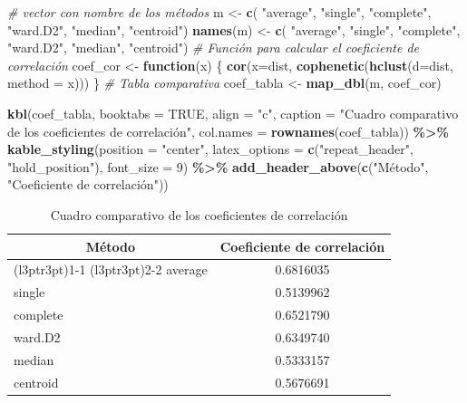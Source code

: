 \documentclass[
]{book}
\newenvironment{Shaded}{\begin{snugshade}}{\end{snugshade}}
\newcommand{\AttributeTok}[1]{\textcolor[rgb]{0.13,0.29,0.53}{#1}}
\newcommand{\CommentTok}[1]{\textcolor[rgb]{0.56,0.35,0.01}{\textit{#1}}}
\newcommand{\ConstantTok}[1]{\textcolor[rgb]{0.56,0.35,0.01}{#1}}
\newcommand{\ControlFlowTok}[1]{\textcolor[rgb]{0.13,0.29,0.53}{\textbf{#1}}}
\newcommand{\DecValTok}[1]{\textcolor[rgb]{0.00,0.00,0.81}{#1}}
\newcommand{\FunctionTok}[1]{\textcolor[rgb]{0.13,0.29,0.53}{\textbf{#1}}}
\newcommand{\NormalTok}[1]{#1}
\newcommand{\OtherTok}[1]{\textcolor[rgb]{0.56,0.35,0.01}{#1}}
\newcommand{\SpecialCharTok}[1]{\textcolor[rgb]{0.81,0.36,0.00}{\textbf{#1}}}
\newcommand{\StringTok}[1]{\textcolor[rgb]{0.31,0.60,0.02}{#1}}
\begin{document}
\begin{Shaded}
\begin{Highlighting}[]
\CommentTok{\# vector con nombre de los métodos}
\NormalTok{m }\OtherTok{\textless{}{-}} \FunctionTok{c}\NormalTok{( }\StringTok{"average"}\NormalTok{, }\StringTok{"single"}\NormalTok{, }\StringTok{"complete"}\NormalTok{, }\StringTok{"ward.D2"}\NormalTok{, }\StringTok{"median"}\NormalTok{, }\StringTok{"centroid"}\NormalTok{)}
\FunctionTok{names}\NormalTok{(m) }\OtherTok{\textless{}{-}} \FunctionTok{c}\NormalTok{( }\StringTok{"average"}\NormalTok{, }\StringTok{"single"}\NormalTok{, }\StringTok{"complete"}\NormalTok{, }\StringTok{"ward.D2"}\NormalTok{, }\StringTok{"median"}\NormalTok{, }\StringTok{"centroid"}\NormalTok{)}
\CommentTok{\# Función para calcular el coeficiente de correlación}
\NormalTok{coef\_cor }\OtherTok{\textless{}{-}} \ControlFlowTok{function}\NormalTok{(x) \{}
  \FunctionTok{cor}\NormalTok{(}\AttributeTok{x=}\NormalTok{dist, }\FunctionTok{cophenetic}\NormalTok{(}\FunctionTok{hclust}\NormalTok{(}\AttributeTok{d=}\NormalTok{dist, }\AttributeTok{method =}\NormalTok{ x)))}
\NormalTok{\}}
\CommentTok{\# Tabla comparativa}
\NormalTok{coef\_tabla }\OtherTok{\textless{}{-}} \FunctionTok{map\_dbl}\NormalTok{(m, coef\_cor) }

\FunctionTok{kbl}\NormalTok{(coef\_tabla, }\AttributeTok{booktabs =} \ConstantTok{TRUE}\NormalTok{, }\AttributeTok{align =} \StringTok{"c"}\NormalTok{,}
    \AttributeTok{caption =} \StringTok{"Cuadro comparativo de los coeficientes de correlación"}\NormalTok{,}
    \AttributeTok{col.names =} \FunctionTok{rownames}\NormalTok{(coef\_tabla)) }\SpecialCharTok{\%\textgreater{}\%}
  \FunctionTok{kable\_styling}\NormalTok{(}\AttributeTok{position =} \StringTok{"center"}\NormalTok{,}
                \AttributeTok{latex\_options =} \FunctionTok{c}\NormalTok{(}\StringTok{"repeat\_header"}\NormalTok{, }\StringTok{"hold\_position"}\NormalTok{),}
                \AttributeTok{font\_size =} \DecValTok{9}\NormalTok{) }\SpecialCharTok{\%\textgreater{}\%}
  \FunctionTok{add\_header\_above}\NormalTok{(}\FunctionTok{c}\NormalTok{(}\StringTok{"Método"}\NormalTok{, }\StringTok{"Coeficiente de correlación"}\NormalTok{))}
\end{Highlighting}
\end{Shaded}

\begin{table}[!h]
\centering
\caption{\label{tab:ac16}Cuadro comparativo de los coeficientes de correlación}
\centering
\fontsize{9}{11}\selectfont
\begin{tabular}[t]{lc}
\toprule
\multicolumn{1}{c}{Método} & \multicolumn{1}{c}{Coeficiente de correlación} \\
\cmidrule(l{3pt}r{3pt}){1-1} \cmidrule(l{3pt}r{3pt}){2-2}
average & 0.6816035\\
single & 0.5139962\\
complete & 0.6521790\\
ward.D2 & 0.6349740\\
median & 0.5333157\\
\addlinespace
centroid & 0.5676691\\
\bottomrule
\end{tabular}
\end{table}
\end{document}
